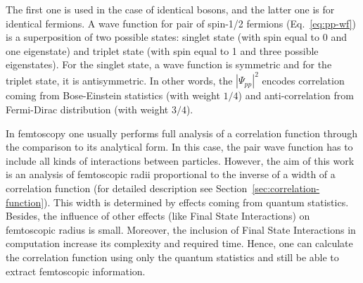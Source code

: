       The first one is used in the case of identical bosons, and the latter one is for identical fermions.
      A wave function for pair of spin-1/2 fermions (Eq.~\ref{eq:pp-wf}) is a superposition of two possible states: singlet state (with spin equal to 0 and one eigenstate) and triplet state (with spin equal to 1 and three possible eigenstates).
      For the singlet state, a wave function is symmetric and for the triplet state, it is antisymmetric.
      In other words, the $|\Psi_{pp}|^2$ encodes correlation coming from Bose-Einstein statistics (with weight $1/4$) and anti-correlation from Fermi-Dirac distribution (with weight $3/4$).

      In femtoscopy one usually performs full analysis of a correlation function through the comparison to its analytical form.
      In this case, the pair wave function has to include all kinds of interactions between particles.
      However, the aim of this work is an analysis of femtoscopic radii proportional to the inverse of a width of a correlation function (for detailed description see Section~\ref{sec:correlation-function}).
      This width is determined by effects coming from quantum statistics.
      Besides, the influence of other effects (like Final State Interactions) on femtoscopic radius is small.
      Moreover, the inclusion of Final State Interactions in computation increase its complexity and required time.
      Hence, one can calculate the correlation function using only the quantum statistics and still be able to extract femtoscopic information.

